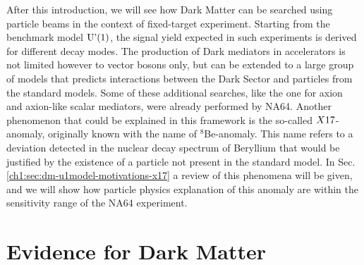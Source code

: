 After this introduction, we will see how Dark Matter can be searched using particle beams in the context of fixed-target experiment. Starting from the benchmark model $\textrm{U'(1)}$, the signal yield expected in such experiments is derived for different decay modes. The production of Dark mediators in accelerators is not limited however to vector bosons only, but can be extended to a large group of models that predicts interactions between the Dark Sector and particles from the standard models. Some of these additional searches, like the one for axion and axion-like scalar mediators, were already performed by NA64.
Another phenomenon that could be explained in this framework is the so-called $X17$-anomaly, originally known with the name of $^8$Be-anomaly. This name refers to a deviation detected in the nuclear decay spectrum of Beryllium that would be justified by the existence of a particle not present in the standard model. In Sec.\ref{ch1:sec:dm-u1model-motivations-x17} a review of this phenomena will be given, and we will show how particle physics explanation of this anomaly are within the sensitivity range of the NA64 experiment.


\section{Evidence for Dark Matter}
\label{ch1:sec:dm-evidence}

